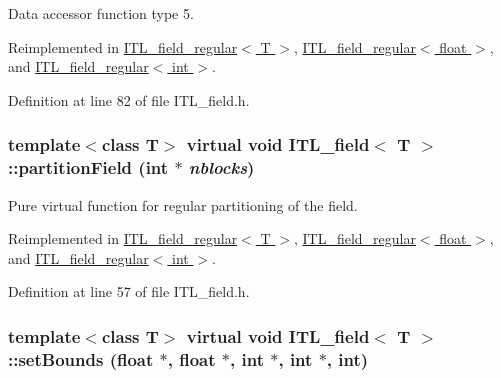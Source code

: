 Data accessor function type 5. 



Reimplemented in \hyperlink{classITL__field__regular_ac1e68a90b1eb23279aa18e5827102b2e}{ITL\_\-field\_\-regular$<$ T $>$}, \hyperlink{classITL__field__regular_ac1e68a90b1eb23279aa18e5827102b2e}{ITL\_\-field\_\-regular$<$ float $>$}, and \hyperlink{classITL__field__regular_ac1e68a90b1eb23279aa18e5827102b2e}{ITL\_\-field\_\-regular$<$ int $>$}.



Definition at line 82 of file ITL\_\-field.h.

\hypertarget{classITL__field_a5c7ecb94890c0dd7d730e881f530bbc2}{
\subsubsection[{partitionField}]{\setlength{\rightskip}{0pt plus 5cm}template$<$class T$>$ virtual void {\bf ITL\_\-field}$<$ T $>$::partitionField (int $\ast$ {\em nblocks})}}
\label{classITL__field_a5c7ecb94890c0dd7d730e881f530bbc2}


Pure virtual function for regular partitioning of the field. 



Reimplemented in \hyperlink{classITL__field__regular_a0497909739ef494ee78808bbbfeaba0f}{ITL\_\-field\_\-regular$<$ T $>$}, \hyperlink{classITL__field__regular_a0497909739ef494ee78808bbbfeaba0f}{ITL\_\-field\_\-regular$<$ float $>$}, and \hyperlink{classITL__field__regular_a0497909739ef494ee78808bbbfeaba0f}{ITL\_\-field\_\-regular$<$ int $>$}.



Definition at line 57 of file ITL\_\-field.h.

\hypertarget{classITL__field_ab27b49b81f3a7a2a614eaca91cd8eb8c}{
\subsubsection[{setBounds}]{\setlength{\rightskip}{0pt plus 5cm}template$<$class T$>$ virtual void {\bf ITL\_\-field}$<$ T $>$::setBounds (float $\ast$, \/  float $\ast$, \/  int $\ast$, \/  int $\ast$, \/  int)}}
\label{classITL__field_ab27b49b81f3a7a2a614eaca91cd8eb8c}


